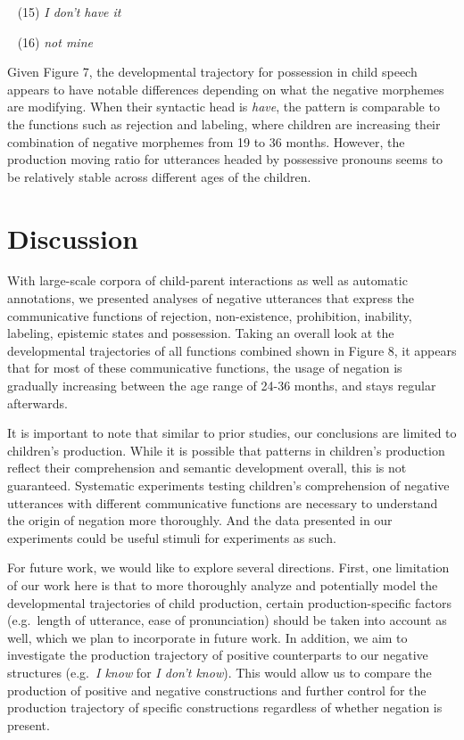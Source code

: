 \documentclass[10pt, letterpaper]{article}
\begin{document}
~ (15) \emph{I don't have it}

~ (16) \emph{not mine}

Given Figure 7, the developmental trajectory for possession in child
speech appears to have notable differences depending on what the
negative morphemes are modifying. When their syntactic head is
\emph{have}, the pattern is comparable to the functions such as
rejection and labeling, where children are increasing their combination
of negative morphemes from 19 to 36 months. However, the production
moving ratio for utterances headed by possessive pronouns seems to be
relatively stable across different ages of the children.

\hypertarget{discussion}{%
\section{Discussion}\label{discussion}}

With large-scale corpora of child-parent interactions as well as
automatic annotations, we presented analyses of negative utterances that
express the communicative functions of rejection, non-existence,
prohibition, inability, labeling, epistemic states and possession.
Taking an overall look at the developmental trajectories of all
functions combined shown in Figure 8, it appears that for most of these
communicative functions, the usage of negation is gradually increasing
between the age range of 24-36 months, and stays regular afterwards.

It is important to note that similar to prior studies, our conclusions
are limited to children's production. While it is possible that patterns
in children's production reflect their comprehension and semantic
development overall, this is not guaranteed. Systematic experiments
testing children's comprehension of negative utterances with different
communicative functions are necessary to understand the origin of
negation more thoroughly. And the data presented in our experiments
could be useful stimuli for experiments as such.

For future work, we would like to explore several directions. First, one
limitation of our work here is that to more thoroughly analyze and
potentially model the developmental trajectories of child production,
certain production-specific factors (e.g.~length of utterance, ease of
pronunciation) should be taken into account as well, which we plan to
incorporate in future work. In addition, we aim to investigate the
production trajectory of positive counterparts to our negative
structures (e.g.~\emph{I know} for \emph{I don't know}). This would
allow us to compare the production of positive and negative
constructions and further control for the production trajectory of
specific constructions regardless of whether negation is present.
\end{document}

